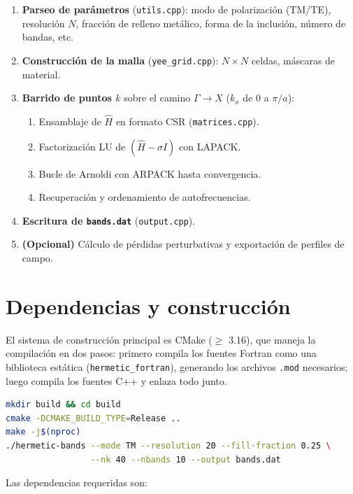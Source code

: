 \documentclass[12pt,a4paper]{article}
\begin{document}
\begin{enumerate}
    \item \textbf{Parseo de parámetros} (\texttt{utils.cpp}): modo de polarización (TM/TE), resolución $N$, fracción de relleno metálico, forma de la inclusión, número de bandas, etc.
    \item \textbf{Construcción de la malla} (\texttt{yee\_grid.cpp}): $N\times N$ celdas, máscaras de material.
    \item \textbf{Barrido de puntos $k$} sobre el camino $\Gamma\to X$ ($k_x$ de $0$ a $\pi/a$):
    \begin{enumerate}
        \item Ensamblaje de $\hat{H}$ en formato CSR (\texttt{matrices.cpp}).
        \item Factorización LU de $(\hat{H}-\sigma I)$ con LAPACK.
        \item Bucle de Arnoldi con ARPACK hasta convergencia.
        \item Recuperación y ordenamiento de autofrecuencias.
    \end{enumerate}
    \item \textbf{Escritura de \texttt{bands.dat}} (\texttt{output.cpp}).
    \item \textbf{(Opcional)} Cálculo de pérdidas perturbativas y exportación de perfiles de campo.
\end{enumerate}

\section{Dependencias y construcción}

El sistema de construcción principal es CMake ($\geq$ 3.16), que maneja la compilación en dos pasos: primero compila los fuentes Fortran como una biblioteca estática (\texttt{hermetic\_fortran}), generando los archivos \texttt{.mod} necesarios; luego compila los fuentes C++ y enlaza todo junto.

\begin{lstlisting}[language=bash, caption={Construccion con CMake}]
mkdir build && cd build
cmake -DCMAKE_BUILD_TYPE=Release ..
make -j$(nproc)
./hermetic-bands --mode TM --resolution 20 --fill-fraction 0.25 \
                 --nk 40 --nbands 10 --output bands.dat
\end{lstlisting}

Las dependencias requeridas son:
\end{document}
